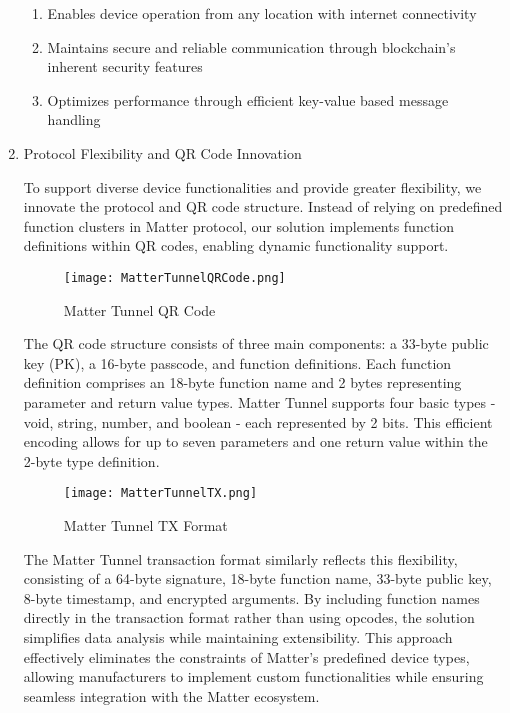 \documentclass[conference]{IEEEtran}
\begin{document}
\begin{enumerate}[itemsep=2ex, parsep=1ex]
\begin{enumerate}[itemsep=2ex, parsep=1ex]
	      	\item Enables device operation from any location with internet connectivity
	      	      	      	      
	      	\item Maintains secure and reliable communication through blockchain's inherent
	      	      security features
	      	      	      	      
	      	\item Optimizes performance through efficient key-value based message handling
	      \end{enumerate}
	      	      
	\item Protocol Flexibility and QR Code Innovation
	      	      
	      To support diverse device functionalities and provide greater flexibility, we innovate the protocol and QR code structure. Instead of relying on predefined function clusters in Matter protocol, our solution implements function definitions within QR codes, enabling dynamic functionality support.
	      	      
	      \begin{figure}[h!]
	      	\centering
	      	\texttt{[image: MatterTunnelQRCode.png]}
	      	\caption{Matter Tunnel QR Code}
	      	\label{fig:MatterTunnelQRCode}
	      \end{figure}
	      	      
	      The QR code structure consists of three main components: a 33-byte public key (PK), a 16-byte passcode, and function definitions. Each function definition comprises an 18-byte function name and 2 bytes representing parameter and return value types. Matter Tunnel supports four basic types - void, string, number, and boolean - each represented by 2 bits. This efficient encoding allows for up to seven parameters and one return value within the 2-byte type definition.
	      	      
	      \begin{figure}[h!]
	      	\centering
	      	\texttt{[image: MatterTunnelTX.png]}
	      	\caption{Matter Tunnel TX Format}
	      	\label{fig:MatterTunnelTXFormat}
	      \end{figure}
	      	      
	      The Matter Tunnel transaction format similarly reflects this flexibility, consisting of a 64-byte signature, 18-byte function name, 33-byte public key, 8-byte timestamp, and encrypted arguments. By including function names directly in the transaction format rather than using opcodes, the solution simplifies data analysis while maintaining extensibility. This approach effectively eliminates the constraints of Matter's predefined device types, allowing manufacturers to implement custom functionalities while ensuring seamless integration with the Matter ecosystem.
	      	                  

\end{enumerate}
\end{document}
